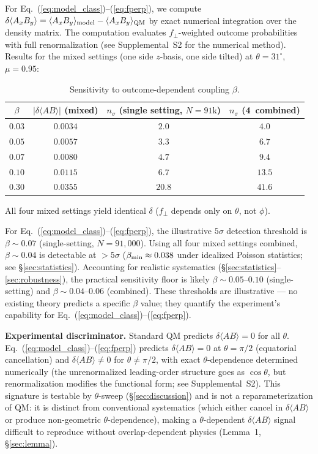 \documentclass[twocolumn,aps,pra,superscriptaddress,floatfix,10pt]{revtex4-2}
\begin{document}
For Eq.~(\ref{eq:model_class})--(\ref{eq:fperp}), we compute $\delta\langle A_x B_y\rangle = \langle A_x B_y\rangle_{\rm model}
- \langle A_x B_y\rangle_{\rm QM}$ by exact numerical integration over the density matrix. The
computation evaluates $f_\perp$-weighted outcome probabilities with full
renormalization (see Supplemental~S2 for the numerical method). Results for
the mixed settings (one side $z$-basis, one side tilted) at $\theta = 31^\circ$, $\mu = 0.95$:

\begin{table}[H]
\centering
\caption{Sensitivity to outcome-dependent coupling $\beta$.}
\label{tab:sensitivity}
\begin{tabular}{cccc}
\toprule
$\beta$ & $|\delta\langle AB\rangle|$ (mixed) & $n_\sigma$ (single setting, $N{=}91\text{k}$) & $n_\sigma$ (4~combined) \\
\midrule
$0.03$ & $0.0034$ & $2.0$ & $4.0$ \\
$0.05$ & $0.0057$ & $3.3$ & $6.7$ \\
$0.07$ & $0.0080$ & $4.7$ & $9.4$ \\
$0.10$ & $0.0115$ & $6.7$ & $13.5$ \\
$0.30$ & $0.0355$ & $20.8$ & $41.6$ \\
\bottomrule
\end{tabular}
\end{table}

All four mixed settings yield identical $\delta$ ($f_\perp$ depends only on $\theta$, not $\phi$).

For Eq.~(\ref{eq:model_class})--(\ref{eq:fperp}), the illustrative $5\sigma$ detection
threshold is $\beta \sim 0.07$ (single-setting, $N = 91{,}000$). Using all four
mixed settings combined, $\beta \sim 0.04$ is detectable at ${>}5\sigma$ ($\beta_{\rm min} \approx 0.038$
under idealized Poisson statistics; see \S\ref{sec:statistics}). Accounting for realistic
systematics (\S\ref{sec:statistics}--\ref{sec:robustness}), the practical sensitivity floor is likely
$\beta \sim 0.05$--$0.10$ (single-setting) and $\beta \sim 0.04$--$0.06$ (combined). These
thresholds are illustrative --- no existing theory predicts a specific $\beta$
value; they quantify the experiment's capability for Eq.~(\ref{eq:model_class})--(\ref{eq:fperp}).

\textbf{Experimental discriminator.} Standard QM predicts $\delta\langle AB\rangle = 0$ for all $\theta$. Eq.~(\ref{eq:model_class})--(\ref{eq:fperp}) predicts $\delta\langle AB\rangle = 0$ at $\theta = \pi/2$ (equatorial cancellation) and $\delta\langle AB\rangle \neq 0$ for $\theta \neq \pi/2$, with exact $\theta$-dependence determined numerically (the unrenormalized leading-order structure goes as $\cos\theta$, but renormalization modifies the functional form; see Supplemental~S2). This signature is testable by $\theta$-sweep (\S\ref{sec:discussion}) and is not a reparameterization of QM: it is distinct from conventional systematics (which either cancel in $\delta\langle AB\rangle$ or produce non-geometric $\theta$-dependence), making a $\theta$-dependent $\delta\langle AB\rangle$ signal difficult to reproduce without overlap-dependent physics (Lemma~1, \S\ref{sec:lemma}).
\end{document}
